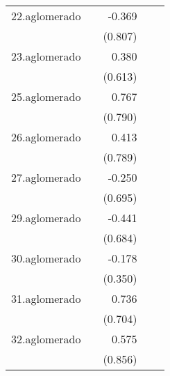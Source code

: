 {\begin{longtable}{l*{4}{D{.}{.}{-1}}}
\addlinespace
22.aglomerado&                     &      -0.369         &                     &                     \\
            &                     &     (0.807)         &                     &                     \\
\addlinespace
23.aglomerado&                     &       0.380         &                     &                     \\
            &                     &     (0.613)         &                     &                     \\
\addlinespace
25.aglomerado&                     &       0.767         &                     &                     \\
            &                     &     (0.790)         &                     &                     \\
\addlinespace
26.aglomerado&                     &       0.413         &                     &                     \\
            &                     &     (0.789)         &                     &                     \\
\addlinespace
27.aglomerado&                     &      -0.250         &                     &                     \\
            &                     &     (0.695)         &                     &                     \\
\addlinespace
29.aglomerado&                     &      -0.441         &                     &                     \\
            &                     &     (0.684)         &                     &                     \\
\addlinespace
30.aglomerado&                     &      -0.178         &                     &                     \\
            &                     &     (0.350)         &                     &                     \\
\addlinespace
31.aglomerado&                     &       0.736         &                     &                     \\
            &                     &     (0.704)         &                     &                     \\
\addlinespace
32.aglomerado&                     &       0.575         &                     &                     \\
            &                     &     (0.856)         &                     &                     \\

\end{longtable}}
